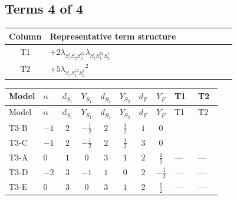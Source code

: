 \documentclass[8pt]{article}
\begin{document}
\begin{landscape}
\subsection*{Terms 4 of 4}
\begin{center}
\begin{tabular}{@{}c >{\raggedright\arraybackslash}p{0.82\linewidth}@{}}
\toprule
Column & Representative term structure \\
\midrule
T1 & \(\displaystyle +2 {\lambda_{S_1^\dagger S_2 S_2^{\dagger 2}}} {\lambda_{S_1 S_1^{\dagger 2}S_2^\dagger}}\) \\
\midrule
T2 & \(\displaystyle +5 {\lambda_{S_1 S_1^{\dagger 2}S_2^\dagger}}^2\) \\
\midrule
\bottomrule
\end{tabular}
\end{center}
\smallskip
\tiny
\begin{longtable}{@{}llcccccc >{\raggedright\arraybackslash}p{0.21\linewidth} >{\raggedright\arraybackslash}p{0.21\linewidth}@{}}
\toprule
Model & $\alpha$ & $d_{S_1}$ & $Y_{S_1}$ & $d_{S_2}$ & $Y_{S_2}$ & $d_F$ & $Y_F$ & T1 & T2 \\
\midrule
\endfirsthead
\toprule
Model & $\alpha$ & $d_{S_1}$ & $Y_{S_1}$ & $d_{S_2}$ & $Y_{S_2}$ & $d_F$ & $Y_F$ & T1 & T2 \\
\midrule
\endhead
T3-B & $-1$ & $2$ & $-\frac{1}{2}$ & $2$ & $\frac{1}{2}$ & $1$ & $0$ & \scriptsize\adjustbox{max width=\linewidth}{$\begin{gathered} +2 {\lambda_{S_1^\dagger S_2 S_2^{\dagger 2}}} {\lambda_{S_1 S_1^{\dagger 2}S_2^\dagger}}\end{gathered}$} & \scriptsize\adjustbox{max width=\linewidth}{$\begin{gathered} +5 {\lambda_{S_1 S_1^{\dagger 2}S_2^\dagger}}^2\end{gathered}$} \\
\midrule
T3-C & $-1$ & $2$ & $-\frac{1}{2}$ & $2$ & $\frac{1}{2}$ & $3$ & $0$ & \scriptsize\adjustbox{max width=\linewidth}{$\begin{gathered} +2 {\lambda_{S_1^\dagger S_2 S_2^{\dagger 2}}} {\lambda_{S_1 S_1^{\dagger 2}S_2^\dagger}}\end{gathered}$} & \scriptsize\adjustbox{max width=\linewidth}{$\begin{gathered} +5 {\lambda_{S_1 S_1^{\dagger 2}S_2^\dagger}}^2\end{gathered}$} \\
\midrule
T3-A & $0$ & $1$ & $0$ & $3$ & $1$ & $2$ & $\frac{1}{2}$ & --- & --- \\
\midrule
T3-D & $-2$ & $3$ & $-1$ & $1$ & $0$ & $2$ & $-\frac{1}{2}$ & --- & --- \\
\midrule
T3-E & $0$ & $3$ & $0$ & $3$ & $1$ & $2$ & $\frac{1}{2}$ & --- & --- \\
\midrule
\bottomrule
\end{longtable}
\clearpage

\end{landscape}
\end{document}
